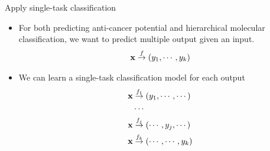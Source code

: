 \documentclass[first=dgreen,second=purple,logo=yellowexc]{aaltoslides}
\begin{document}
{\begin{frame}{Apply single-task classification}
	\begin{itemize}
		\item For both predicting anti-cancer potential and hierarchical molecular classification, we want to predict multiple output given an input.
		\begin{align*}
			\mathbf {x} \overset{f}{\rightarrow} (y_{1},\cdots,y_{k})
		\end{align*}
		\item We can learn a single-task classification model for each output
		\begin{align*}
			\mathbf {x} &\overset{f_1}{\rightarrow} (y_{1},\cdots,\cdots)\\
			&\cdots\\
			\mathbf {x} &\overset{f_j}{\rightarrow} (\cdots,y_{j},\cdots)\\
			\mathbf {x} &\overset{f_k}{\rightarrow} (\cdots,\cdots,y_{k})\\
		\end{align*}
	\end{itemize}
\end{frame}

}
\end{document}
